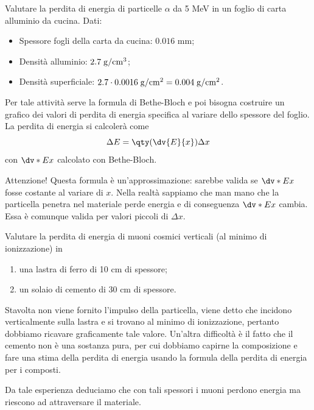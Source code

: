 \begin{esercizio}
    Valutare la perdita di energia di particelle $\alpha$ da 5 MeV in un foglio di carta alluminio da cucina. Dati:

    \begin{itemize}
        \item Spessore fogli della carta da cucina: $0.016$ mm;
        \item Densità alluminio: $2.7 \; \rm g/cm^3$;
        \item Densità superficiale: $2.7 \cdot 0.0016 \rm \; g/cm^2=0.004 \; g/cm^2$.
    \end{itemize}
    
    Per tale attività serve la formula di Bethe-Bloch e poi bisogna costruire un grafico dei valori di perdita di energia specifica al variare dello spessore del foglio. La perdita di energia si calcolerà come
    \begin{equation*}
        \Delta E=\qty(\dv{E}{x}) \Delta x
    \end{equation*}
    con $\dv*{E}{x}$ calcolato con Bethe-Bloch.

    Attenzione! Questa formula è un'approssimazione: sarebbe valida se $\dv*{E}{x}$ fosse costante al variare di $x$. Nella realtà sappiamo che man mano che la particella penetra nel materiale perde energia e di conseguenza $\dv*{E}{x}$ cambia. Essa è comunque valida per valori piccoli di $\Delta x$.
\end{esercizio}

\begin{esercizio}
    Valutare la perdita di energia di muoni cosmici verticali (al minimo di ionizzazione) in
    \begin{enumerate}[label=\alph*.]
        \item una lastra di ferro di 10 cm di spessore;
        \item un solaio di cemento di 30 cm di spessore.
    \end{enumerate}
    Stavolta non viene fornito l'impulso della particella, viene detto che incidono verticalmente sulla lastra e si trovano al minimo di ionizzazione, pertanto dobbiamo ricavare graficamente tale valore. Un'altra difficoltà è il fatto che il cemento non è una sostanza pura, per cui dobbiamo capirne la composizione e fare una stima della perdita di energia usando la formula della perdita di energia per i composti.
    
    Da tale esperienza deduciamo che con tali spessori i muoni perdono energia ma riescono ad attraversare il materiale.
\end{esercizio}


